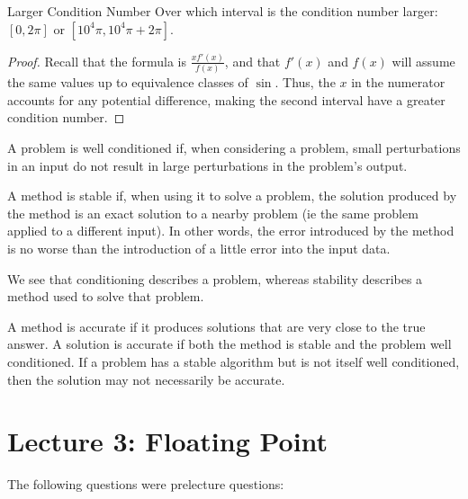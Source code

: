 \documentclass[../main.tex]{subfiles}
\begin{document}
\begin{problem}{Larger Condition Number}
    Over which interval is the condition number larger: $[0, 2\pi]$ or $[10^4 \pi, 10^4 \pi + 2 \pi]$.
\end{problem}
\begin{proof}
    Recall that the formula is $\frac{x f'(x)}{f(x)}$, and that $f'(x)$ and $f(x)$ will assume the same values up to 
    equivalence classes of $\sin.$ Thus, the $x$ in the numerator accounts for any potential difference, making the second
    interval have a greater condition number.
\end{proof}

\begin{definition}
    A problem is well conditioned if, when considering a problem,
    small perturbations in an input do not result in large perturbations in the problem's output.
\end{definition}

\begin{definition}
    A method is stable if, when using it to solve a problem, the solution produced by the method is an exact solution to a nearby problem (ie the same problem applied to a different input). In other words, the error introduced by the method is no worse than the introduction of a little error into the input data.
\end{definition}


\begin{remark}
    We see that conditioning describes a problem, whereas stability describes a method used to solve that problem.
\end{remark}

\begin{definition}
    A method is accurate if it produces solutions that are very close to the true answer. A solution is accurate if both the method
    is stable and the problem well conditioned. If a problem has a stable algorithm but is not itself well conditioned, then 
    the solution may not necessarily be accurate.
\end{definition}


\section{Lecture 3: Floating Point}

The following questions were prelecture questions:
\end{document}
